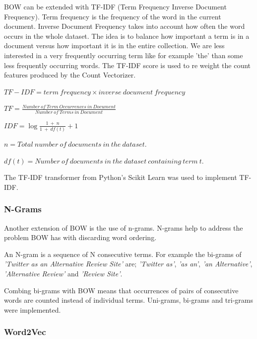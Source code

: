 BOW can be extended with TF-IDF (Term Frequency Inverse Document Frequency). Term frequency is the frequency of the word in the current document. Inverse Document Frequency takes into account how often the word occurs in the whole dataset. The idea is to balance how important a term is in a document versus how important it is in the entire collection. We are less interested in a very frequently occurring term like for example 'the' than some less frequently occurring words. The TF-IDF score is used to re weight the count features produced by the Count Vectorizer.

\begin{tcolorbox}
\begin{center}
$TF-IDF = term\ frequency \times inverse\ document\ frequency$ 

$TF = \frac{Number\ of\ Term\ Occurrences\ in\ Document}{Number\ of\ Terms\ in\ Document}$

$IDF = \log \frac{1\ +\ n}{1\ +\ df(t)} + 1$

$n = Total\ number\ of\ documents\ in\ the\ dataset.$

$df(t) = Number\ of\ documents\ in\ the\ dataset\ containing\ term\ t.$
\end{center}
\end{tcolorbox}
The TF-IDF transformer from Python's Scikit Learn was used to implement TF-IDF.


\subsubsection*{N-Grams}

Another extension of BOW is the use of n-grams. N-grams help to address the problem BOW has with discarding word ordering.

An N-gram is a sequence of N consecutive terms. For example the bi-grams of \emph{'Twitter as an Alternative Review Site'} are; \emph{'Twitter as'}, \emph{'as an'}, \emph{'an Alternative'}, \emph{'Alternative Review'} and \emph{'Review Site'}.

Combing bi-grams with BOW means that occurrences of pairs of consecutive words are counted instead of individual terms. Uni-grams, bi-grams and tri-grams were implemented.

\subsubsection{Word2Vec}

